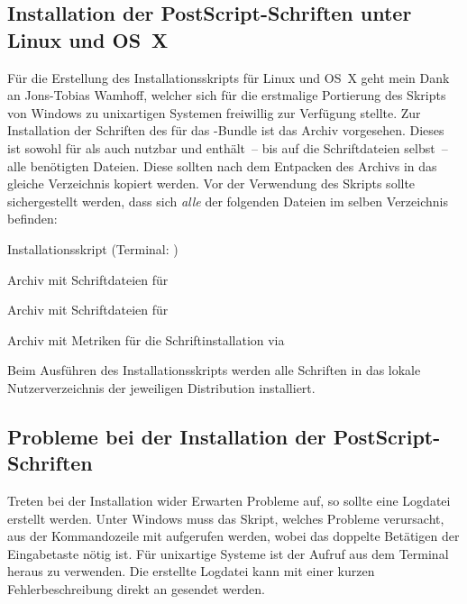 \subsection{Installation der PostScript-Schriften unter Linux und OS~X}
\label{sec:install:fonts:unix}
Für die Erstellung des Installationsskripts für Linux und OS~X geht mein Dank 
an Jons-Tobias Wamhoff, welcher sich für die erstmalige Portierung des Skripts 
von Windows zu unixartigen Systemen freiwillig zur Verfügung stellte.
Zur Installation der Schriften des \CDs für das \TUDScript-Bundle ist das Archiv
%
{} vorgesehen. Dieses ist sowohl für 
 als auch  
nutzbar und enthält~-- bis auf die Schriftdateien selbst~-- alle benötigten 
Dateien. Diese sollten nach dem Entpacken des Archivs in das gleiche 
Verzeichnis kopiert werden. Vor der Verwendung des Skripts 
 sollte sichergestellt werden, dass sich 
\emph{alle} der folgenden Dateien im selben Verzeichnis befinden:
%
\settowidth{}%
\begin{description}[labelwidth=\tempdim,labelsep=1em]
  \item[\File{tudscrfonts\_install.sh}]Installationsskript
    (Terminal: )
  \item[\File{Univers\_PS.zip}]Archiv mit Schriftdateien für \Univers
  \item[\File{DIN\_Bd\_PS.zip}]Archiv mit Schriftdateien für \DIN
  \item[\File{tudscrfonts.zip}]Archiv mit Metriken für die
    Schriftinstallation via 
\end{description}
%
Beim Ausführen des Installationsskripts werden alle Schriften in das lokale 
Nutzerverzeichnis der jeweiligen Distribution installiert.


\subsection{Probleme bei der Installation der PostScript-Schriften}
Treten bei der Installation wider Erwarten Probleme auf, so sollte eine 
Logdatei erstellt werden. Unter Windows muss das Skript, welches Probleme 
verursacht, aus der Kommandozeile mit
 aufgerufen werden, wobei das 
doppelte Betätigen der Eingabetaste nötig ist. Für unixartige Systeme 
ist der Aufruf  aus dem 
Terminal heraus zu verwenden. Die erstellte Logdatei kann mit einer kurzen 
Fehlerbeschreibung direkt an \Email{\tudscrmail} gesendet werden.



